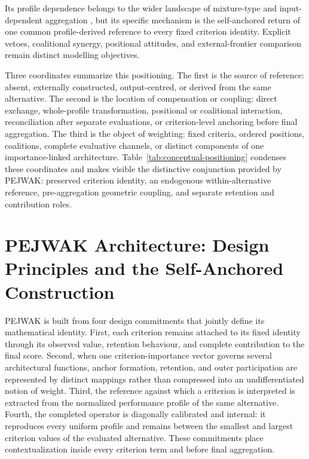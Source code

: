 \documentclass[reqno,11pt]{amsart}
\theoremstyle{definition}
\theoremstyle{plain}
\theoremstyle{remark}
\begin{document}
Its profile dependence belongs to the wider landscape of mixture-type
and input-dependent aggregation \cite{Beliakov2007,Mesiar2006}, but its
specific mechanism is the self-anchored return of one common
profile-derived reference to every fixed criterion identity. Explicit
vetoes, coalitional synergy, positional attitudes, and external-frontier
comparison remain distinct modelling objectives.

Three coordinates summarize this positioning. The first is the source of
reference: absent, externally constructed, output-centred, or derived
from the same alternative. The second is the location of compensation or
coupling: direct exchange, whole-profile transformation, positional or
coalitional interaction, reconciliation after separate evaluations, or
criterion-level anchoring before final aggregation. The third is the
object of weighting: fixed criteria, ordered positions, coalitions,
complete evaluative channels, or distinct components of one
importance-linked architecture. Table~\ref{tab:conceptual-positioning}
condenses these coordinates and makes visible the distinctive conjunction
provided by PEJWAK: preserved criterion identity, an endogenous
within-alternative reference, pre-aggregation geometric coupling, and
separate retention and contribution roles.

\section{PEJWAK Architecture: Design Principles and the Self-Anchored Construction}
\label{sec:design-self-anchored}

PEJWAK is built from four design commitments that jointly define its
mathematical identity. First, each criterion remains attached to its
fixed identity through its observed value, retention behaviour, and
complete contribution to the final score. Second, when one
criterion-importance vector governs several architectural functions,
anchor formation, retention, and outer participation are represented by
distinct mappings rather than compressed into an undifferentiated notion
of weight. Third, the reference against which a criterion is interpreted
is extracted from the normalized performance profile of the same
alternative. Fourth, the completed operator is diagonally calibrated and
internal: it reproduces every uniform profile and remains between the
smallest and largest criterion values of the evaluated alternative.
These commitments place contextualization inside every criterion term
and before final aggregation.
\end{document}
